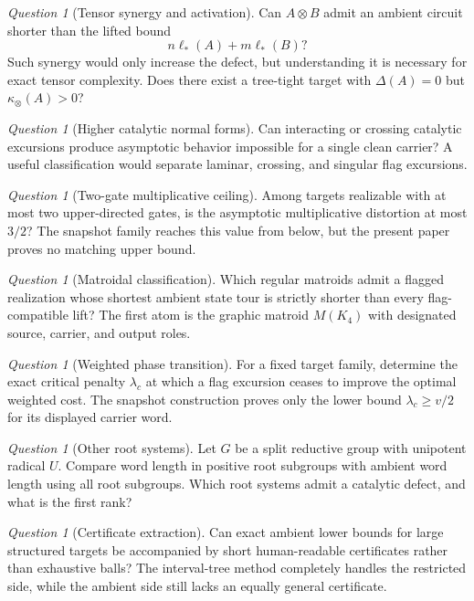 \documentclass[11pt]{amsart}
\numberwithin{equation}{section}
\theoremstyle{definition}
\theoremstyle{remark}
\newtheorem{question}[theorem]{Question}
\newcommand{\ellAll}{\ell_{*}}
\newcommand{\DeltaDef}{\Delta}
\begin{document}
\begin{question}[Tensor synergy and activation]
Can $A\otimes B$ admit an ambient circuit shorter than the lifted bound
\[
n\ellAll(A)+m\ellAll(B)?
\]
Such synergy would only increase the defect, but understanding it is necessary for exact tensor complexity.  Does there exist a tree-tight target with $\DeltaDef(A)=0$ but $\kappa_\otimes(A)>0$?
\end{question}

\begin{question}[Higher catalytic normal forms]
Can interacting or crossing catalytic excursions produce asymptotic behavior impossible for a single clean carrier?  A useful classification would separate laminar, crossing, and singular flag excursions.
\end{question}

\begin{question}[Two-gate multiplicative ceiling]
Among targets realizable with at most two upper-directed gates, is the asymptotic multiplicative distortion at most $3/2$?  The snapshot family reaches this value from below, but the present paper proves no matching upper bound.
\end{question}

\begin{question}[Matroidal classification]
Which regular matroids admit a flagged realization whose shortest ambient state tour is strictly shorter than every flag-compatible lift?  The first atom is the graphic matroid $M(K_4)$ with designated source, carrier, and output roles.
\end{question}

\begin{question}[Weighted phase transition]
For a fixed target family, determine the exact critical penalty $\lambda_c$ at which a flag excursion ceases to improve the optimal weighted cost.  The snapshot construction proves only the lower bound $\lambda_c\ge v/2$ for its displayed carrier word.
\end{question}

\begin{question}[Other root systems]
Let $G$ be a split reductive group with unipotent radical $U$.  Compare word length in positive root subgroups with ambient word length using all root subgroups.  Which root systems admit a catalytic defect, and what is the first rank?
\end{question}

\begin{question}[Certificate extraction]
Can exact ambient lower bounds for large structured targets be accompanied by short human-readable certificates rather than exhaustive balls?  The interval-tree method completely handles the restricted side, while the ambient side still lacks an equally general certificate.
\end{question}
\end{document}
